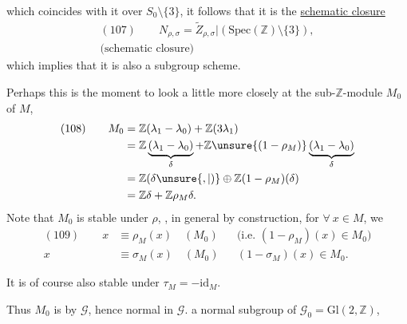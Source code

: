 
which coincides with it over $S_0\setminus\{3\}$, it
follows that it is the \uline{schematic closure}
\[
\begin{gathered}
(107)\qquad
N_{\rho,\sigma}=\widetilde Z_{\rho,\sigma}|(\mathrm{Spec}(\mathbb Z)\setminus\{3\}),\\
\text{(schematic closure)}
\end{gathered}
\]
which implies that it is also a subgroup scheme.

Perhaps this is the moment to look a little more closely at the
sub-$\mathbb Z$-module $M_0$ of $M$,
\[
\begin{aligned}
(108)\qquad M_0
&=\mathbb Z(\lambda_1-\lambda_0)+\mathbb Z(3\lambda_1)\\
&=\mathbb Z\underbrace{(\lambda_1-\lambda_0)}_{\delta}
 +\mathbb Z\unsure{(1-\rho_M)}\underbrace{(\lambda_1-\lambda_0)}_{\delta}\\
&=\mathbb Z(\delta\unsure{,|)}\oplus\mathbb Z(1-\rho_M)(\delta)\\
&=\mathbb Z\delta+\mathbb Z\rho_M\delta.
\end{aligned}
\]
Note that $M_0$ is stable under $\rho$, \inserted{$\sigma$}, in
general by construction, for $\forall\ x\in M$, we
\[
\begin{aligned}
(109)\qquad x&\equiv\rho_M(x)\quad(M_0)
 &&\text{(i.e. }(1-\rho_M)(x)\in M_0\text{)}\\
x&\equiv\sigma_M(x)\quad(M_0)
 &&(1-\sigma_M)(x)\in M_0.
\end{aligned}
\]

It is of course also stable under $\tau_M=-\mathrm{id}_M$.

Thus $M_0$ is  by $\mathcal G$, hence
 normal in
$\mathcal G$.
 a normal
subgroup of $\mathcal G_0=\mathrm{Gl}(2,\mathbb Z)$,


